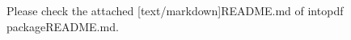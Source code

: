\documentclass{article}
\begin{document}
Please check the attached [text/markdown]{README.md of intopdf package}{README.md}.
\end{document}
